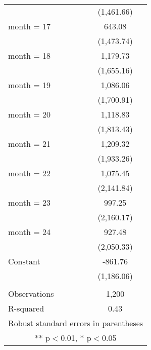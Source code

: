 \begin{tabular}{lc}
 & (1,461.66) \\
month = 17 & 643.08 \\
 & (1,473.74) \\
month = 18 & 1,179.73 \\
 & (1,655.16) \\
month = 19 & 1,086.06 \\
 & (1,700.91) \\
month = 20 & 1,118.83 \\
 & (1,813.43) \\
month = 21 & 1,209.32 \\
 & (1,933.26) \\
month = 22 & 1,075.45 \\
 & (2,141.84) \\
month = 23 & 997.25 \\
 & (2,160.17) \\
month = 24 & 927.48 \\
 & (2,050.33) \\
Constant & -861.76 \\
 & (1,186.06) \\
 &  \\
Observations & 1,200 \\
 R-squared & 0.43 \\ \hline
\multicolumn{2}{c}{ Robust standard errors in parentheses} \\
\multicolumn{2}{c}{ ** p$<$0.01, * p$<$0.05} \\
\end{tabular}
